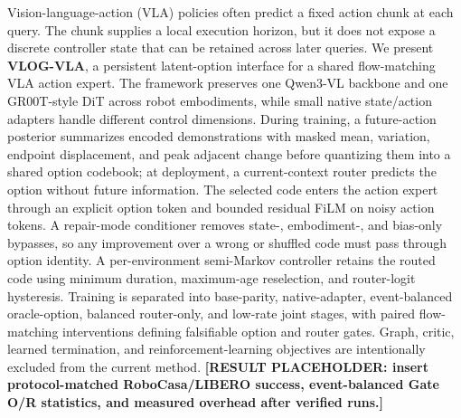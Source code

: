 Vision-language-action (VLA) policies often predict a fixed action chunk at
each query.  The chunk supplies a local execution horizon, but it does not
expose a discrete controller state that can be retained across later queries.
We present \textbf{VLOG-VLA}, a persistent latent-option interface for a shared
flow-matching VLA action expert.  The framework preserves one Qwen3-VL backbone
and one GR00T-style DiT across robot embodiments, while small native
state/action adapters handle different control dimensions.  During training, a
future-action posterior summarizes encoded demonstrations with masked mean,
variation, endpoint displacement, and peak adjacent change before quantizing
them into a shared option codebook; at deployment, a current-context router
predicts the option without future information.  The selected code enters the
action expert through an explicit option token and bounded residual FiLM on
noisy action tokens.  A repair-mode conditioner removes state-, embodiment-,
and bias-only bypasses, so any improvement over a wrong or shuffled code must
pass through option identity.
A per-environment semi-Markov controller retains the routed code using minimum
duration, maximum-age reselection, and router-logit hysteresis.  Training is
separated into base-parity, native-adapter, event-balanced oracle-option,
balanced router-only, and low-rate joint stages, with paired flow-matching
interventions defining falsifiable option and router gates.  Graph, critic,
learned termination, and reinforcement-learning objectives are intentionally
excluded from the current method.  \textbf{[RESULT PLACEHOLDER: insert
protocol-matched RoboCasa/LIBERO success, event-balanced Gate O/R statistics,
and measured overhead after verified runs.]}
